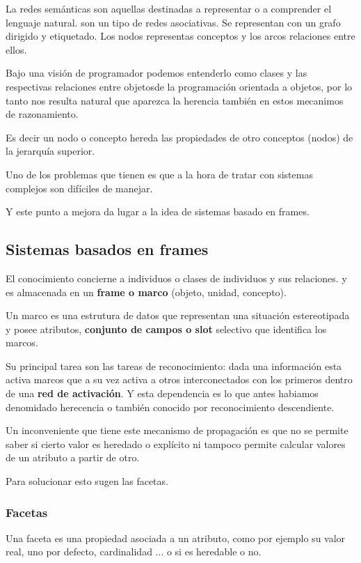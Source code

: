 \documentclass[12 pt, a4paper]{article}
\begin{document}
La redes semánticas son aquellas destinadas a representar o a comprender el lenguaje natural.
son un tipo de redes asociativas. 
Se representan con un grafo dirigido y etiquetado. Los nodos representas conceptos
y los arcos relaciones entre ellos. 

Bajo una visión de programador podemos entenderlo como clases y las respectivas relaciones entre objetosde la 
programación orientada a objetos, por lo tanto 
nos resulta natural que aparezca la herencia también en estos mecanimos de razonamiento. 


Es decir un nodo o concepto hereda las propiedades de otro conceptos (nodos) de la jerarquía superior. 

Uno de los problemas que tienen es que a la hora 
de tratar con sistemas complejos son difíciles de manejar.

Y este punto a mejora da lugar a la idea de sistemas basado en frames. 


\subsection{Sistemas basados en frames}
El conocimiento concierne a individuos o clases de individuos y sus relaciones. 
y es almacenada en un \textbf{frame o marco} (objeto, unidad, concepto).

Un marco es una estrutura de datos que representan una situación estereotipada y posee atributos, \textbf{conjunto de campos o slot} 
selectivo que identifica los marcos. 

Su principal tarea son las tareas de reconocimiento: dada una información esta activa marcos que a su vez activa a otros interconectados con los primeros
dentro de una  \textbf{red de activación}. Y esta dependencia es lo que antes habiamos denomidado herecencia o también conocido por
reconocimiento descendiente. 

Un inconveniente que tiene este mecanismo de propagación es que no se permite saber si cierto 
valor es heredado o explícito ni tampoco permite calcular valores de un atributo a partir de otro. 

Para solucionar esto sugen las facetas. 

\subsubsection{Facetas}  

Una faceta es una propiedad asociada a un atributo, como por ejemplo su valor real, uno por defecto, cardinalidad ... o si es heredable o no. 
\end{document}
